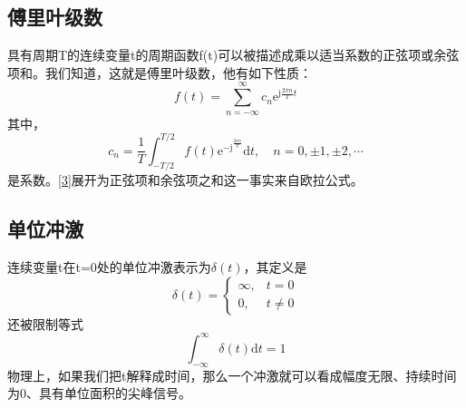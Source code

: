 \documentclass[UTF8,a4paper]{ctexart}
\begin{document}
\subsection{傅里叶级数}
具有周期T的连续变量t的周期函数f(t)可以被描述成乘以适当系数的正弦项或余弦项和。我们知道，这就是傅里叶级数，他有如下性质：
\begin{equation}\label{3}
	f(t)=\sum_{n=-\infty}^{\infty} c_{n} \mathrm{e}^{\mathrm{j} \frac{2 \pi n}{T} t}
\end{equation}
其中，
\begin{equation}
	c_{n}=\frac{1}{T} \int_{-T / 2}^{T / 2} f(t) \mathrm{e}^{-\mathrm{j}^{\frac{2 \pi n}{T}}} \mathrm{d} t, \quad n=0,\pm 1,\pm 2, \cdots
\end{equation}
是系数。\eqref{3}展开为正弦项和余弦项之和这一事实来自欧拉公式。
\subsection{单位冲激}
连续变量t在t=0处的单位冲激表示为$\delta(t)$，其定义是
\begin{equation}
	\delta(t)=\left\{\begin{array}{ll}
		\infty, & t=0      \\
		0,      & t \neq 0
	\end{array}\right.\end{equation}
还被限制等式
\begin{equation}
	\int_{-\infty}^{\infty} \delta(t) \mathrm{d} t=1
\end{equation}
物理上，如果我们把t解释成时间，那么一个冲激就可以看成幅度无限、持续时间为0、具有单位面积的尖峰信号。
\end{document}

